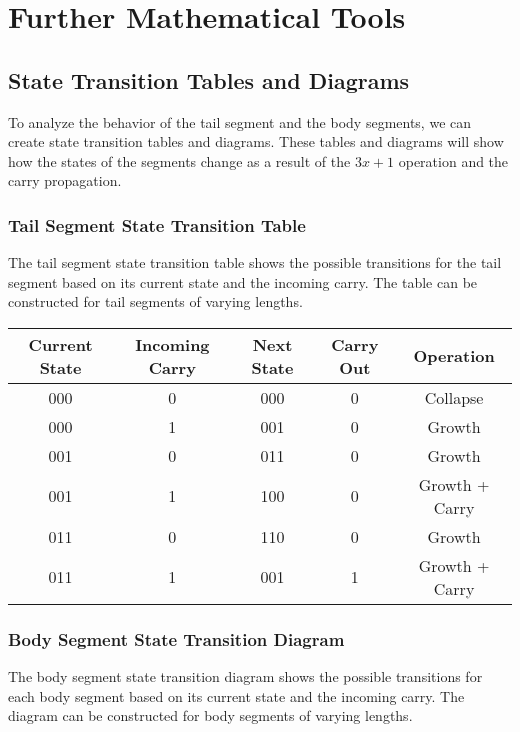 \documentclass{article}
\begin{document}
\section{Further Mathematical Tools}

\subsection{State Transition Tables and Diagrams}
To analyze the behavior of the tail segment and the body segments, we can create state transition tables and diagrams. These tables and diagrams will show how the states of the segments change as a result of the $3x + 1$ operation and the carry propagation.

\subsubsection{Tail Segment State Transition Table}
The tail segment state transition table shows the possible transitions for the tail segment based on its current state and the incoming carry. The table can be constructed for tail segments of varying lengths.

\begin{center}
\begin{tabular}{ |c|c|c|c|c| } 
 \hline
 Current State & Incoming Carry & Next State & Carry Out & Operation \\ 
 \hline
 000 & 0 & 000 & 0 & Collapse \\ 
 000 & 1 & 001 & 0 & Growth \\ 
 001 & 0 & 011 & 0 & Growth \\ 
 001 & 1 & 100 & 0 & Growth + Carry \\ 
 011 & 0 & 110 & 0 & Growth \\ 
 011 & 1 & 001 & 1 & Growth + Carry \\ 
 \hline
\end{tabular}
\end{center}

\subsubsection{Body Segment State Transition Diagram}
The body segment state transition diagram shows the possible transitions for each body segment based on its current state and the incoming carry. The diagram can be constructed for body segments of varying lengths.

\begin{center}
\end{center}
\end{document}
